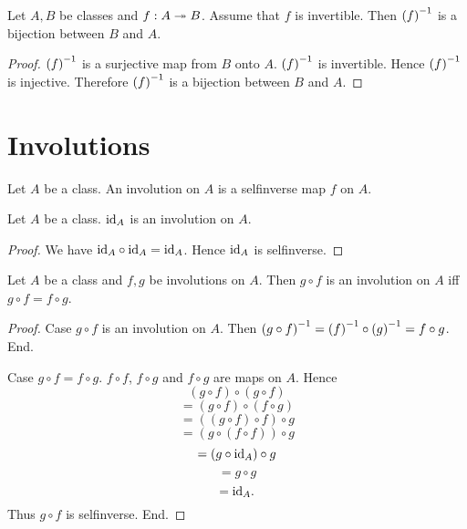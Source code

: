 \documentclass[../../set-theory/set-theory.tex]{subfiles}
\begin{document}
  \begin{forthel}
    \begin{corollary}
      Let $A, B$ be classes and $f : A \twoheadrightarrow B$.
      Assume that $f$ is invertible.
      Then $\left(f\right)^{-1}$ is a bijection between $B$ and $A$.
    \end{corollary}
    \begin{proof}
      $\left(f\right)^{-1}$ is a surjective map from $B$ onto $A$.
      $\left(f\right)^{-1}$ is invertible.
      Hence $\left(f\right)^{-1}$ is injective.
      Therefore $\left(f\right)^{-1}$ is a bijection between $B$ and $A$.
    \end{proof}
  \end{forthel}


  \section{Involutions}

  \begin{forthel}
    \begin{definition}
      Let $A$ be a class.
      An involution on $A$ is a selfinverse map $f$ on $A$.
    \end{definition}
  \end{forthel}

  \begin{forthel}
    \begin{proposition}
      Let $A$ be a class.
      $\mathrm{id}_{A}$ is an involution on $A$.
    \end{proposition}
    \begin{proof}
      We have $\mathrm{id}_{A} \circ \mathrm{id}_{A} = \mathrm{id}_{A}$.
      Hence $\mathrm{id}_{A}$ is selfinverse.
    \end{proof}
  \end{forthel}

  \begin{forthel}
    \begin{proposition}
      Let $A$ be a class and $f, g$ be involutions on $A$.
      Then $g \circ f$ is an involution on $A$ iff $g \circ f = f \circ g$.
    \end{proposition}
    \begin{proof}
      Case $g \circ f$ is an involution on $A$.
        Then $\left(g \circ f\right)^{-1} = \left(f\right)^{-1} \circ \left(g\right)^{-1} = f \circ g$.
      End.

      Case $g \circ f = f \circ g$.
        $f \circ f$, $f \circ g$ and $f \circ g$ are maps on $A$.
        Hence
        \[  (g \circ f) \circ (g \circ f)       \]
        \[    = (g \circ f) \circ (f \circ g)   \]
        \[    = ((g \circ f) \circ f) \circ g   \]
        \[    = (g \circ (f \circ f)) \circ g   \]
        \[    = (g \circ \mathrm{id}_{A}) \circ g       \]
        \[    = g \circ g                       \]
        \[    = \mathrm{id}_{A}.                        \]
        Thus $g \circ f$ is selfinverse.
      End.
    \end{proof}
  \end{forthel}
\end{document}
